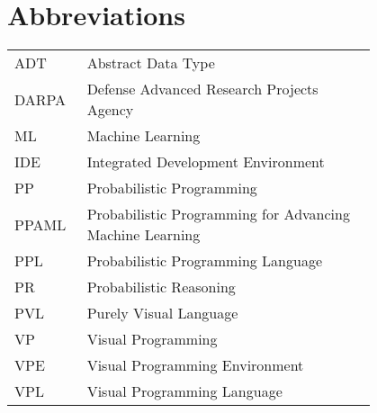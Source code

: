 \chapter*{Abbreviations}

\begin{flushleft}
\begin{tabular}{l p{0.8\linewidth}}
ADT      & Abstract Data Type\\
DARPA    & Defense Advanced Research Projects Agency\\
ML       & Machine Learning\\
IDE      & Integrated Development Environment\\
PP       & Probabilistic Programming\\
PPAML    & Probabilistic Programming for Advancing Machine Learning\\
PPL      & Probabilistic Programming Language\\
PR       & Probabilistic Reasoning\\
PVL      & Purely Visual Language\\
VP       & Visual Programming\\
VPE      & Visual Programming Environment\\
VPL      & Visual Programming Language
\end{tabular}
\end{flushleft}
